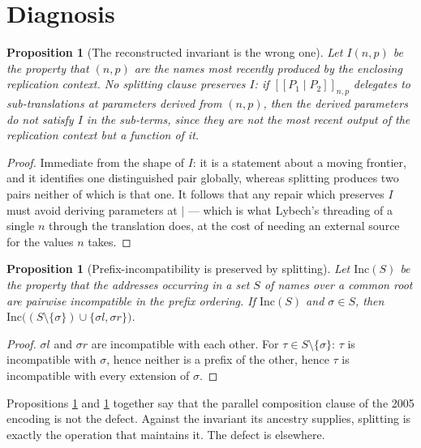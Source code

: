 \documentclass[11pt]{article}
\theoremstyle{definition}
\theoremstyle{plain}
\newtheorem{proposition}[definition]{Proposition}
\theoremstyle{remark}
\newcommand{\enc}[1]{[\![#1]\!]}
\begin{document}
\section{Diagnosis}\label{sec:diagnosis}

\begin{proposition}[The reconstructed invariant is the wrong one]
\label{prop:wronginv}
Let $I(n,p)$ be the property that $(n,p)$ are the names most recently
produced by the enclosing replication context. No splitting clause
preserves $I$: if $\enc{P_1 \mid P_2}_{n,p}$ delegates to sub-translations
at parameters derived from $(n,p)$, then the derived parameters do not
satisfy $I$ in the sub-terms, since they are not the most recent output of
the replication context but a function of it.
\end{proposition}

\begin{proof}
Immediate from the shape of $I$: it is a statement about a moving
frontier, and it identifies one distinguished pair globally, whereas
splitting produces two pairs neither of which is that one. It follows
that any repair which preserves $I$ must avoid deriving parameters at
$\mid$ --- which is what Lybech's threading of a single $n$ through the
translation does, at the cost of needing an external source for the
values $n$ takes.
\end{proof}

\begin{proposition}[Prefix-incompatibility is preserved by splitting]
\label{prop:rightinv}
Let $\mathrm{Inc}(S)$ be the property that the addresses occurring in a
set $S$ of names over a common root are pairwise incompatible in the
prefix ordering. If $\mathrm{Inc}(S)$ and $\sigma \in S$, then
$\mathrm{Inc}\big((S \setminus \{\sigma\}) \cup \{\sigma l, \sigma r\}\big)$.
\end{proposition}

\begin{proof}
$\sigma l$ and $\sigma r$ are incompatible with each other. For
$\tau \in S \setminus \{\sigma\}$: $\tau$ is incompatible with $\sigma$,
hence neither is a prefix of the other, hence $\tau$ is incompatible with
every extension of $\sigma$.
\end{proof}

Propositions \ref{prop:wronginv} and \ref{prop:rightinv} together say
that the parallel composition clause of the 2005 encoding is not the
defect. Against the invariant its ancestry supplies, splitting is exactly
the operation that maintains it. The defect is elsewhere.
\end{document}
